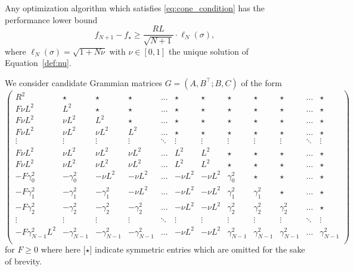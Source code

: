 \documentclass{article}
\begin{document}
\begin{corollary}\label{cor:lower}
  Any optimization algorithm which satisfies \eqref{eq:cone_condition} has the performance lower bound
  \[
    f_{N+1}-f_\star\geq \frac{RL}{\sqrt{N+1}}\cdot \ell_N(\sigma),
  \]
  where $\ell_N(\sigma) = \sqrt{1+N \nu}$ with $\nu\in[0,1]$ the unique solution of Equation~\eqref{def:nu}. 
\end{corollary}
\begin{appendixproof}

  We consider candidate Grammian matrices $G=(A , B^\top ; B ,C)$ of the form
  \[
    \left(\begin{array}{ccccccc|ccccc}
      R^2 & \star  & \star  & \star  & \dots & \star  & \star & \star & \star & \star & \dots & \star  \\
      F \nu L^2  & L^2 & \star & \star  & \dots & \star & \star & \star & \star & \star& \dots & \star  \\
      F \nu L^2 & \nu L^2 & L^2 & \star & \dots & \star & \star & \star & \star & \star & \dots & \star   \\
      F \nu L^2 & \nu L^ 2 & \nu L^2 & L^2 &\dots  &  \star &\star  & \star & \star & \star & \dots & \star \\
      \vdots & \vdots & \vdots & \vdots &  \ddots  & \vdots & \vdots &\vdots &\vdots & \vdots & \ddots & \vdots \\
      F \nu L^2 & \nu L^ 2 & \nu L^ 2 & \nu L^ 2 & \dots & L^2 & L^2 & \star & \star & \star & \dots & \star \\
      F \nu L^2 & \nu L^ 2 & \nu L^ 2 & \nu L^ 2 & \dots & L^2 & L^2 & \star & \star & \star & \dots & \star \\
      \hline
      - F\gamma_{0}^2  & - \gamma_{0}^2  & - \nu L^ 2 & - \nu L^ 2 & \dots & - \nu L^ 2 & - \nu L^ 2 & \gamma_{0}^2  & \star & \star  & \dots & \star \\
      - F\gamma_{1}^2  &  - \gamma_{1}^2  & - \gamma_{1}^2  & - \nu L^ 2& \dots  & - \nu L^ 2 & - \nu L^ 2 & \gamma_{1}^2  & \gamma_{1}^2  & \star & \dots & \star \\
      -F\gamma_{2}^2 & -\gamma_{2}^2  & -\gamma_{2}^2  & -\gamma_{2}^2 & \dots & - \nu L^2 & - \nu L^2  &  \gamma_{2}^2    & \gamma_{2}^2  & \gamma_{2}^2  & \dots & \star \\
      \vdots & \vdots & \vdots & \vdots & \ddots  & \vdots  & \vdots &\vdots &  \vdots & \vdots & \ddots & \vdots \\
      - F\gamma_{N-1}^2 L^2 & -\gamma_{N-1}^2 & -\gamma_{N-1}^2 & -\gamma_{N-1}^2 & \dots & -\nu L^2 & -\nu L^2 & \gamma_{N-1}^2 & \gamma_{N - 1}^2 & \gamma_{N-1}^2 & \dots & \gamma_{N - 1}^2  \\
    \end{array}\right)
\]
for $F\geq 0$ where here [$\star$] indicate symmetric entries which are omitted for the sake of brevity.


\end{appendixproof}
\end{document}
